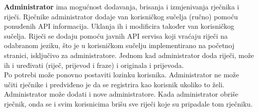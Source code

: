 		\indent \textbf{Administrator} ima mogućnost dodavanja, brisanja i izmjenivanja rječnika i riječi. Rječnike administrator dodaje van korisničkog sučelja (ručno) pomoću ponuđenih API informacija. Uklanja ih i modificira također van korisničkog sučelja. Riječi se dodaju pomoću javnih API servisa koji vraćaju riječi na odabranom jeziku, što je u korisničkom sučelju implementirano na početnoj stranici, isključivo za administratore. Jednom kad administrator doda riječi, može ih i uređivati (riječ, prijevod i fraze) i originala i prijevoda.
		\\

		\noindent Po potrebi može ponovno postaviti lozinku korisnika. Administrator ne može učiti rječnike i predviđeno je da se registrira kao korisnik ukoliko to želi. Administrator može dodati i nove administratore. Kada administrator obriše rječnik, onda se i svim korisnicima brišu sve riječi koje su pripadale tom rječniku.
		\\
		\\

		\eject
		
	